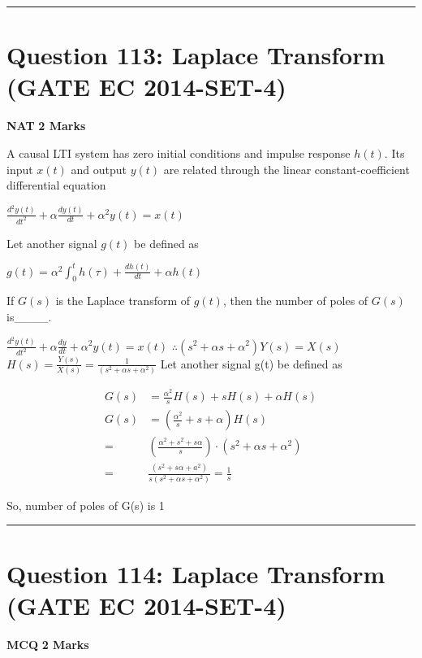 \documentclass[11pt,a4paper]{article}
\begin{document}
\vspace{1.5em}
\hrule
\vspace{1.5em}

\section*{Question 113: Laplace Transform (GATE EC 2014-SET-4)}
\noindent \textbf{\color{primary}NAT} \hfill \textbf{\color{secondary}2 Marks}


\noindent A causal LTI system has zero initial conditions and impulse response $h(t)$. Its
input $x(t)$ and output $y(t)$ are related through the linear constant-coefficient
differential equation 

$\frac{d^{2}y(t)}{dt^{2}}+\alpha \frac{dy(t)}{dt}+\alpha ^{2}y(t)=x(t)$

 Let another signal $g(t)$ be defined as 

 $g(t)=\alpha ^{2}\int_{0}^{t}h(\tau )+\frac{dh(t)}{dt}+\alpha h(t)$
 
 If $G(s)$ is the Laplace transform of $g(t)$, then the number of poles of $G(s)$ is\_\_\_\_.


\begin{tcolorbox}[solbox, title=Detailed Solution -- Question 113]
$\frac{d^{2} y(t)}{d t^{2}}+\alpha \frac{d y}{d t}+\alpha^{2} y(t)=x(t)$
$\therefore\left(s^{2}+\alpha s+\alpha^{2}\right) Y(s)=X(s)$
$H(s)=\frac{Y(s)}{X(s)}=\frac{1}{\left(s^{2}+\alpha s+\alpha^{2}\right)}$
 Let another signal g(t) be defined as 

\[
\begin{aligned} G(s)&=\frac{\alpha^{2}}{s} H(s)+s H(s)+\alpha H(s) \\ G(s) &=\left(\frac{\alpha^{2}}{s}+s+\alpha\right) H(s) \\ =&\left(\frac{\alpha^{2}+s^{2}+s \alpha}{s}\right) \cdot\left(s^{2}+\alpha s+\alpha^{2}\right) \\ =& \frac{\left(s^{2}+s \alpha+a^{2}\right)}{s\left(s^{2}+\alpha s+\alpha^{2}\right)}=\frac{1}{s} \end{aligned}
\]

 So, number of poles of G(s) is 1
\end{tcolorbox}

\vspace{1.5em}
\hrule
\vspace{1.5em}

\section*{Question 114: Laplace Transform (GATE EC 2014-SET-4)}
\noindent \textbf{\color{primary}MCQ} \hfill \textbf{\color{secondary}2 Marks}
\end{document}
